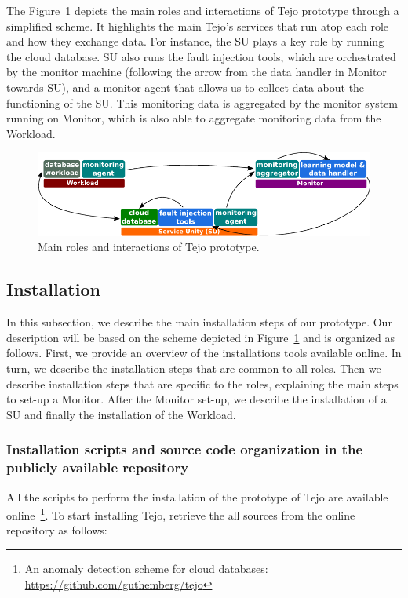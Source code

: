 The Figure~\ref{fig:roles_scheme} depicts the main roles and interactions of Tejo prototype through a simplified scheme. It highlights the main Tejo's services that run atop each role and how they exchange data. For instance, the SU plays a key role by running the cloud database. SU also runs the fault injection tools, which are orchestrated by the monitor machine (following the arrow from the data handler in Monitor towards SU), and a monitor agent that allows us to collect data about the functioning of the SU. This monitoring data is aggregated by the monitor system running on Monitor, which is also able to aggregate monitoring data from the Workload.


\begin{figure}[!h]
  \centering
     \includegraphics[width=1\textwidth]{inputs/img/roles_scheme}
  \caption{Main roles and interactions of Tejo prototype.}
  \label{fig:roles_scheme}
\end{figure}


\subsection{Installation}

In this subsection, we describe the main installation steps of our prototype. Our description will be based on the scheme depicted in Figure~\ref{fig:roles_scheme} and is organized as follows. First, we provide an overview of the installations tools available online. In turn, we describe the installation steps that are common to all roles. Then we describe installation steps that are specific to the roles, explaining the main steps to set-up a Monitor. After the Monitor set-up, we describe the installation of a SU and finally the installation of the Workload.

\subsubsection{Installation scripts and source code organization in the publicly available repository}
\label{subsubsec:gitclone}

All the scripts to perform the installation of the prototype of Tejo are available online~\footnote{An anomaly detection scheme for cloud databases: \url{https://github.com/guthemberg/tejo}}.  To start installing Tejo, retrieve the all sources from the online repository as follows:



